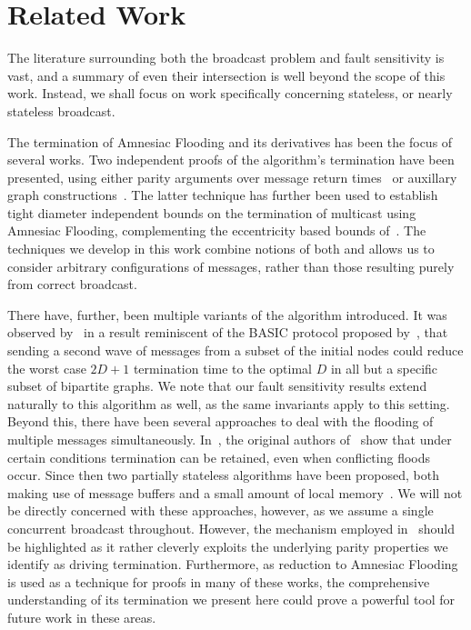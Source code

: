 
\section{Related Work}
\label{sec: relatedwork}
The literature surrounding both the broadcast problem and fault sensitivity is vast, and a summary of even their intersection is well beyond the scope of this work. Instead, we shall focus on work specifically concerning stateless, or nearly stateless broadcast.

The termination of Amnesiac Flooding and its derivatives has been the focus of several works. Two independent proofs of the algorithm's termination have been presented, using either parity arguments over message return times~\cite{hussak2023termination} or auxillary graph constructions~\cite{turau2021amnesiac}. The latter technique has further been used to establish tight diameter independent bounds on the termination of multicast using Amnesiac Flooding, complementing the eccentricity based bounds of~\cite{hussak2023termination}. The techniques we develop in this work combine notions of both and allows us to consider arbitrary configurations of messages, rather than those resulting purely from correct broadcast. 

There have, further, been multiple variants of the algorithm introduced. It was observed by~\cite{turau2020stateless} in a result reminiscent of the BASIC protocol proposed by~\cite{gopal1999fast}, that sending a second wave of messages from a subset of the initial nodes could reduce the worst case $2D+1$ termination time to the optimal $D$ in all but a specific subset of bipartite graphs. We note that our fault sensitivity results extend naturally to this algorithm as well, as the same invariants apply to this setting. Beyond this, there have been several approaches to deal with the flooding of multiple messages simultaneously. In~\cite{HT-AFCases-Arxiv20}, the original authors of~\cite{hussak2023termination} show that under certain conditions termination can be retained, even when conflicting floods occur. Since then two partially stateless algorithms have been proposed, both making use of message buffers and a small amount of local memory~\cite{turau2021synchronous, bayramzadeh2021weak}. We will not be directly concerned with these approaches, however, as we assume a single concurrent broadcast throughout. However, the mechanism employed in~\cite{turau2021synchronous} should be highlighted as it rather cleverly exploits the underlying parity properties we identify as driving termination. Furthermore, as reduction to Amnesiac Flooding is used as a technique for proofs in many of these works, the comprehensive understanding of its termination we present here could prove a powerful tool for future work in these areas.

